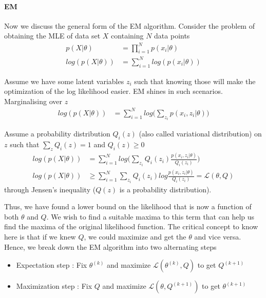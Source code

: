\documentclass[../statistical_learning_notes.tex]{subfiles}
\begin{document}
\paragraph{EM} Now we discuss the general form of the EM algorithm. Consider the problem of obtaining the MLE of data set $X$ containing $N$ data points
\begin{align*}
    p(X|\theta) &= \prod_{i=1}^{N} p(x_{i}|\theta)\\
    log(p(X|\theta)) &= \sum_{i=1}^{N} log(p(x_{i}|\theta))
\end{align*}

Assume we have some latent variables $z_{i}$ such that knowing those will make the optimization of the log likelihood easier. EM shines in such scenarios. Marginalising over $z$
\begin{align*}
    log(p(X|\theta)) &= \sum_{i=1}^{N} log \bigg(\sum_{z_{i}} p(x_{i}, z_{i}|\theta) \bigg)
\end{align*}

Assume a probability distribution $Q_{i}(z)$ (also called variational distribution) on $z$ such that $\sum_{z} Q_{i}(z) = 1$ and $Q_{i}(z) \geq 0$
\begin{align*}
    log(p(X|\theta)) &= \sum_{i=1}^{N} log \bigg( \sum_{z_{i}} Q_{i}(z_{i}) \frac{p(x_{i}, z_{i}|\theta)}{Q_{i}(z_{i})} \bigg)\\
    log(p(X|\theta)) &\geq \sum_{i=1}^{N} \sum_{z_{i}} Q_{i}(z_{i}) log \frac{p(x_{i}, z_{i}|\theta)}{Q_{i}(z_{i})} = \mathcal{L}(\theta, Q)
\end{align*}
through Jensen's inequality ($Q(z)$ is a probability distribution).\newline

Thus, we have found a lower bound on the likelihood that is now a function of both $\theta$ and $Q$. We wish to find a suitable maxima to this term that can help us find the maxima of the original likelihood function. The critical concept to know here is that if we knew $Q$, we could maximize and get the $\theta$ and vice versa. Hence, we break down the EM algorithm into two alternating steps
\begin{itemize}
    \item Expectation step : Fix $\theta^{(k)}$ and maximize $\mathcal{L}(\theta^{(k)},Q)$ to get $Q^{(k+1)}$
    \item Maximization step : Fix $Q$ and maximize $\mathcal{L}(\theta, Q^{(k+1)})$ to get $\theta^{(k+1)}$
\end{itemize}
\end{document}
